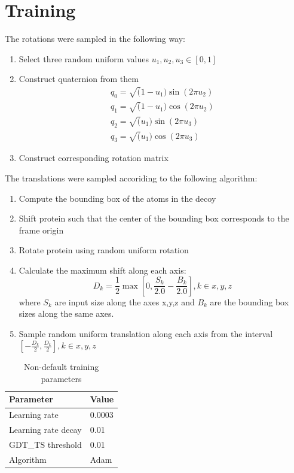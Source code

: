 \documentclass[letter,10pt]{article}
\begin{document}
\section{Training}
The rotations were sampled in the following way:
\begin{enumerate}
\item Select three random uniform values $u_1, u_2, u_3 \in [0,1]$
\item Construct quaternion from them
\begin{eqnarray}
q_0 = \sqrt(1-u_1) \sin(2\pi  u_2) \\
q_1 = \sqrt(1-u_1) \cos(2\pi  u_2) \\
q_2 = \sqrt(u_1) \sin(2\pi  u_3) \\
q_3 = \sqrt(u_1) \cos(2\pi  u_3) 
\end{eqnarray}
\item Construct corresponding rotation matrix
\end{enumerate}


The translations were sampled accoriding to the following algorithm:
\begin{enumerate}
\item Compute the bounding box of the atoms in the decoy
\item Shift protein such that the center of the bounding box corresponds to the frame origin 
\item Rotate protein using random uniform rotation
\item Calculate the maximum shift along each axis:
$$
D_k = \frac{1}{2}\max\left[ 0, \frac{S_k}{2.0} - \frac{B_k}{2.0} \right], k \in {x, y, z}
$$
where $S_k$ are input size along the axes x,y,z and $B_k$ are the bounding box sizes along the same axes.
\item Sample random uniform translation along each axis from the interval $[-\frac{D_k}{2}, \frac{D_k}{2}], k \in {x,y,z}$
\end{enumerate}


\begin{table}[H]
\begin{center}
\begin{tabular}{ l | l }

    Parameter & Value \\
    \hline
    Learning rate& 0.0003\\
    Learning rate decay& 0.01\\
    GDT\_TS threshold& 0.01\\
    Algorithm& Adam
    
\end{tabular}
\caption{Non-default training parameters}
%
\label{Tbl:TrainingParam}
\end{center}
\end{table}
\end{document}
